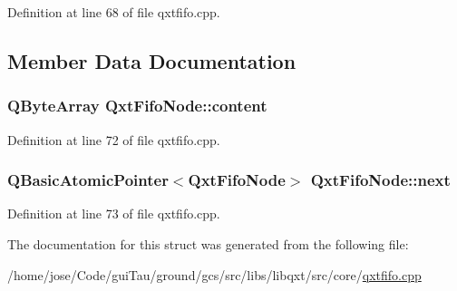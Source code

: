 Definition at line 68 of file qxtfifo.\-cpp.



\subsection{Member Data Documentation}
\hypertarget{struct_qxt_fifo_node_a7787ff3c93d0ae4761a4f7eed5c7ac21}{
\subsubsection[{content}]{\setlength{\rightskip}{0pt plus 5cm}Q\-Byte\-Array Qxt\-Fifo\-Node\-::content}}\label{struct_qxt_fifo_node_a7787ff3c93d0ae4761a4f7eed5c7ac21}


Definition at line 72 of file qxtfifo.\-cpp.

\hypertarget{struct_qxt_fifo_node_a5a6a4241d949794065ed10413101f165}{
\subsubsection[{next}]{\setlength{\rightskip}{0pt plus 5cm}Q\-Basic\-Atomic\-Pointer$<${\bf Qxt\-Fifo\-Node}$>$ Qxt\-Fifo\-Node\-::next}}\label{struct_qxt_fifo_node_a5a6a4241d949794065ed10413101f165}


Definition at line 73 of file qxtfifo.\-cpp.



The documentation for this struct was generated from the following file\-:\begin{DoxyCompactItemize}
\item 
/home/jose/\-Code/gui\-Tau/ground/gcs/src/libs/libqxt/src/core/\hyperlink{qxtfifo_8cpp}{qxtfifo.\-cpp}\end{DoxyCompactItemize}
